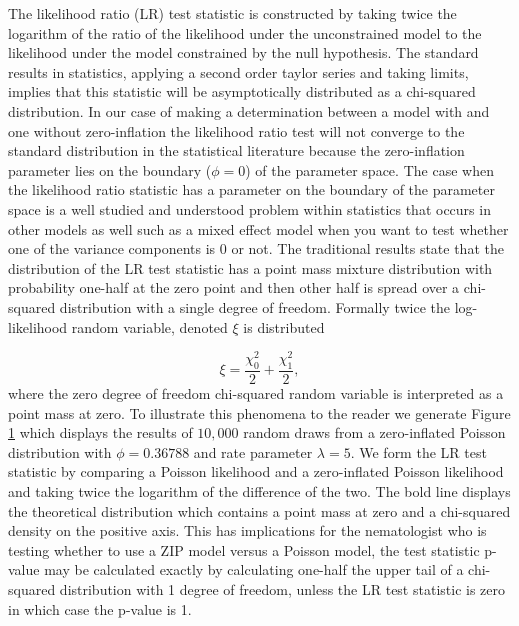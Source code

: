 \documentclass{article}
\begin{document}
The likelihood ratio (LR) test statistic is constructed by taking twice the logarithm of the ratio of the likelihood under the unconstrained model to the likelihood under the model constrained by the null hypothesis. The standard results in statistics, applying a second order taylor series and taking limits, implies that this statistic will be asymptotically distributed as a chi-squared distribution. In our case of making a determination between a model with and one without zero-inflation the likelihood ratio test will not converge to the standard distribution in the statistical literature because the zero-inflation parameter lies on the boundary ($\phi=0$) of the parameter space. The case when the likelihood ratio statistic has a parameter on the boundary of the parameter space is a well studied and understood problem within statistics that occurs in other models as well such as a mixed effect model when you want to test whether one of the variance components is 0 or not. The traditional results state that the distribution of the LR test statistic has a point mass mixture distribution with probability one-half at the zero point and then other half is spread over a chi-squared distribution with a single degree of freedom. Formally twice the log-likelihood random variable, denoted $\xi$ is distributed 

\begin{equation}
\xi = \frac{\chi^2_0}{2} + \frac{\chi^2_1}{2},
\end{equation}
where the zero degree of freedom chi-squared random variable is interpreted as a point mass at zero. To illustrate this phenomena to the reader we generate Figure \ref{fig:twice_log_likelihood} which displays the results of $10,000$ random draws from a zero-inflated Poisson distribution with $\phi=0.36788$ and rate parameter $\lambda=5$. 
We form the LR test statistic by comparing a Poisson likelihood and a zero-inflated Poisson likelihood and taking twice the logarithm of the difference of the two. The bold line displays the  theoretical distribution which contains a point mass at zero and a chi-squared density on the positive axis. This has implications for the nematologist who is testing whether to use a ZIP model versus a Poisson model, the test statistic p-value may be calculated exactly by calculating one-half the upper tail of a chi-squared distribution with 1 degree of freedom, unless the LR test statistic is zero in which case the p-value is 1. 

\begin{figure}[H]
\label{fig:twice_log_likelihood}
\vspace{0.5in}
\vspace{0.5in}
\end{figure}
\end{document}
